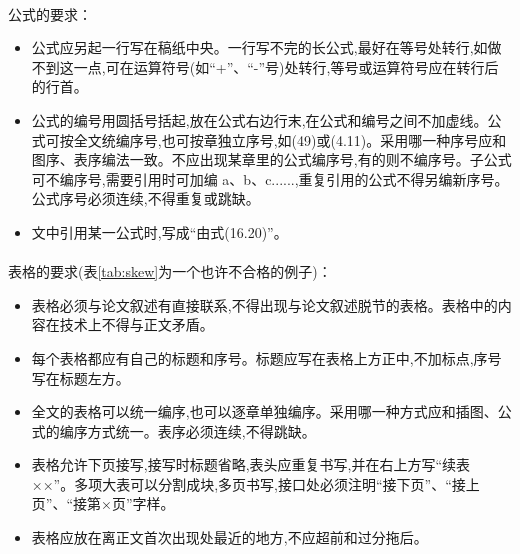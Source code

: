 ﻿\documentclass{sysuthesis}
\begin{document}
\paragraph{}公式的要求：

\begin{itemize}
\item 公式应另起一行写在稿纸中央。一行写不完的长公式,最好在等号处转行,如做不到这一点,可在运算符号(如“+”、“-”号)处转行,等号或运算符号应在转行后的行首。
\item 公式的编号用圆括号括起,放在公式右边行末,在公式和编号之间不加虚线。公式可按全文统编序号,也可按章独立序号,如(49)或(4.11)。采用哪一种序号应和图序、表序编法一致。不应出现某章里的公式编序号,有的则不编序号。子公式可不编序号,需要引用时可加编 a、b、c......,重复引用的公式不得另编新序号。公式序号必须连续,不得重复或跳缺。
\item 文中引用某一公式时,写成“由式(16.20)”。
\end{itemize}

\paragraph{}表格的要求(表\ref{tab:skew}为一个也许不合格的例子)：

\begin{itemize}
\item 表格必须与论文叙述有直接联系,不得出现与论文叙述脱节的表格。表格中的内容在技术上不得与正文矛盾。
\item 每个表格都应有自己的标题和序号。标题应写在表格上方正中,不加标点,序号写在标题左方。
\item 全文的表格可以统一编序,也可以逐章单独编序。采用哪一种方式应和插图、公式的编序方式统一。表序必须连续,不得跳缺。
\item 表格允许下页接写,接写时标题省略,表头应重复书写,并在右上方写“续表××”。多项大表可以分割成块,多页书写,接口处必须注明“接下页”、“接上页”、“接第×页”字样。
\item 表格应放在离正文首次出现处最近的地方,不应超前和过分拖后。
\end{itemize}
\end{document}
